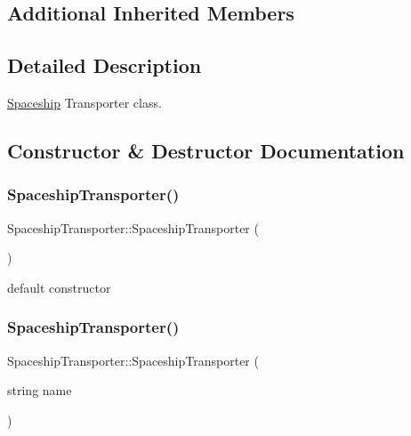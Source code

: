 \subsection*{Additional Inherited Members}


\subsection{Detailed Description}
\hyperlink{classSpaceship}{Spaceship} Transporter class. 

\subsection{Constructor \& Destructor Documentation}
\mbox{\label{classSpaceshipTransporter_a4478bc1ce68fb2306fb31849123b3eae}} 
\subsubsection{\texorpdfstring{Spaceship\+Transporter()}{SpaceshipTransporter()}\hspace{0.1cm}{\footnotesize\ttfamily [1/2]}}
{\footnotesize\ttfamily Spaceship\+Transporter\+::\+Spaceship\+Transporter (\begin{DoxyParamCaption}{ }\end{DoxyParamCaption})\hspace{0.3cm}{\ttfamily [inline]}}

default constructor \mbox{\label{classSpaceshipTransporter_a6c6a1df8547e7ab9988f9a5f26403e0b}} 
\subsubsection{\texorpdfstring{Spaceship\+Transporter()}{SpaceshipTransporter()}\hspace{0.1cm}{\footnotesize\ttfamily [2/2]}}
{\footnotesize\ttfamily Spaceship\+Transporter\+::\+Spaceship\+Transporter (\begin{DoxyParamCaption}\item[{string}]{name }\end{DoxyParamCaption})\hspace{0.3cm}{\ttfamily [inline]}}

